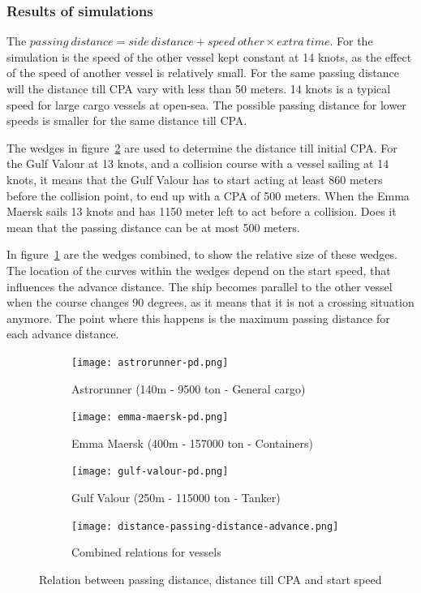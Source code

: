 \subsubsection{Results of simulations}
The $passing~distance = side~distance + speed~other \times extra~time$.
For the simulation is the speed of the other vessel kept constant at 14 knots, as the effect of the speed of another vessel is relatively small. For the same passing distance will the distance till CPA vary with less than 50 meters. 14 knots is a typical speed for large cargo vessels at open-sea. The possible passing distance for lower speeds is smaller for the same distance till CPA.

The wedges in figure~\ref{fig:result-distance-passing-distance-start-speed} are used to determine the distance till initial CPA. For the Gulf Valour at 13 knots, and a collision course with a vessel sailing  at 14 knots, it means that the Gulf Valour has to start acting at least 860 meters before the collision point, to end up with a \ac{CPA} of 500 meters.
When the Emma Maersk sails 13 knots and has 1150 meter left to act before a collision. Does it mean that the passing distance can be at most 500 meters. 

In figure~\ref{fig:result-passing-distance-combined} are the wedges combined, to show the relative size of these wedges. The location of the curves within the wedges depend on the start speed, that influences the advance distance.
The ship becomes parallel to the other vessel when the course changes 90 degrees, as it means that it is not a crossing situation anymore. The point where this happens is the maximum passing distance for each advance distance.

\begin{figure}[!p]
	\centering
	\begin{subfigure}[b]{0.48\textwidth}
		\texttt{[image: astrorunner-pd.png]} 
		\caption{Astrorunner (140m - 9500 ton - General cargo)} 
	\end{subfigure}
	\hfill
	\begin{subfigure}[b]{0.48\textwidth}
		\texttt{[image: emma-maersk-pd.png]} 
		\caption{Emma Maersk (400m - 157000 ton - Containers)} 
	\end{subfigure}

	\medskip \bigskip
	\begin{subfigure}[b]{0.48\linewidth}
		\texttt{[image: gulf-valour-pd.png]} 
		\caption{Gulf Valour (250m - 115000 ton - Tanker)} 
	\end{subfigure}
	\hfill
	\begin{subfigure}[b]{0.48\textwidth}
		\texttt{[image: distance-passing-distance-advance.png]} 
		\caption{Combined relations for vessels}
		\label{fig:result-passing-distance-combined}
	\end{subfigure}

	\caption{Relation between passing distance, distance till CPA and start speed} 
	\label{fig:result-distance-passing-distance-start-speed} 
\end{figure}

